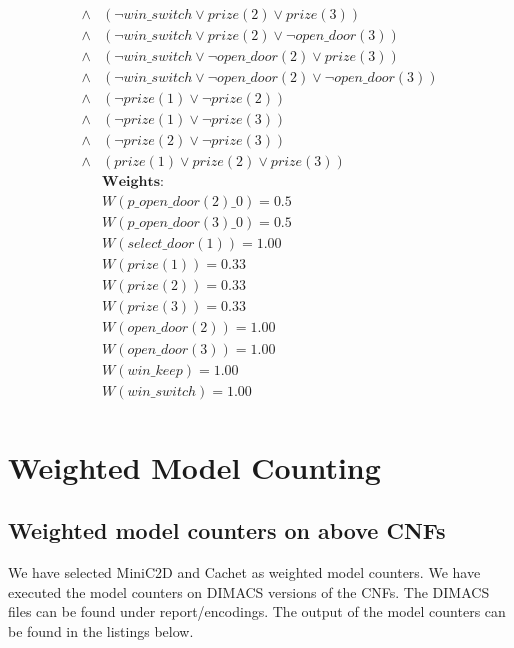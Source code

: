 \begin{align*}
    \land & (\neg win\_switch \lor prize(2) \lor prize(3))                            \\
    \land & (\neg win\_switch \lor prize(2) \lor \neg open\_door(3))                  \\
    \land & (\neg win\_switch \lor \neg open\_door(2) \lor prize(3))                  \\
    \land & (\neg win\_switch \lor \neg open\_door(2) \lor \neg open\_door(3))        \\
    \land & (\neg prize(1) \lor \neg prize(2))                                        \\
    \land & (\neg prize(1) \lor \neg prize(3))                                        \\
    \land & (\neg prize(2) \lor \neg prize(3))                                        \\
    \land & (prize(1) \lor prize(2) \lor prize(3))\\
    & \textbf{Weights:}             \\
    & W(p\_open\_door(2)\_0) = 0.5 \\
    & W(p\_open\_door(3)\_0) = 0.5 \\
    & W(select\_door(1)) = 1.00    \\
    & W(prize(1)) = 0.33           \\
    & W(prize(2)) = 0.33           \\
    & W(prize(3)) = 0.33           \\
    & W(open\_door(2)) = 1.00      \\
    & W(open\_door(3)) = 1.00      \\
    & W(win\_keep) = 1.00          \\
    & W(win\_switch) = 1.00        \\
\end{align*}


\section{Weighted Model Counting}
\subsection{Weighted model counters on above CNFs}
We have selected MiniC2D and Cachet as weighted model counters.
We have executed the model counters on DIMACS versions of the CNFs. The DIMACS files can be found under report/encodings.
The output of the model counters can be found in the listings below.


